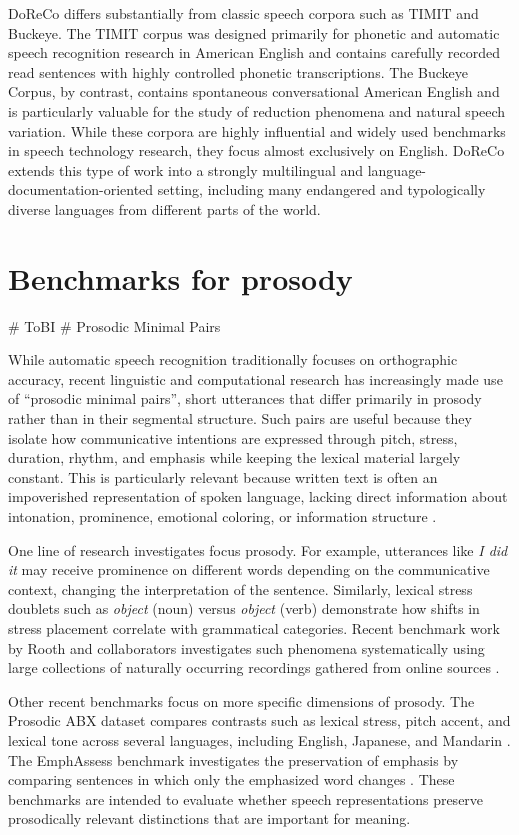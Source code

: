 DoReCo differs substantially from classic speech corpora such as TIMIT and Buckeye. The TIMIT corpus was designed primarily for phonetic and automatic speech recognition research in American English and contains carefully recorded read sentences with highly controlled phonetic transcriptions. The Buckeye Corpus, by contrast, contains spontaneous conversational American English and is particularly valuable for the study of reduction phenomena and natural speech variation. While these corpora are highly influential and widely used benchmarks in speech technology research, they focus almost exclusively on English. DoReCo extends this type of work into a strongly multilingual and language-documentation-oriented setting, including many endangered and typologically diverse languages from different parts of the world.

\section{Benchmarks for prosody}

# ToBI
# Prosodic Minimal Pairs

While automatic speech recognition traditionally focuses on orthographic accuracy, recent linguistic and computational research has increasingly made use of ``prosodic minimal pairs'', short utterances that differ primarily in prosody rather than in their segmental structure. Such pairs are useful because they isolate how communicative intentions are expressed through pitch, stress, duration, rhythm, and emphasis while keeping the lexical material largely constant. This is particularly relevant because written text is often an impoverished representation of spoken language, lacking direct information about intonation, prominence, emotional coloring, or information structure \cite{nguyen2023expresso}.

One line of research investigates focus prosody. For example, utterances like \textit{I did it} may receive prominence on different words depending on the communicative context, changing the interpretation of the sentence. Similarly, lexical stress doublets such as \textit{object} (noun) versus \textit{object} (verb) demonstrate how shifts in stress placement correlate with grammatical categories. Recent benchmark work by Rooth and collaborators investigates such phenomena systematically using large collections of naturally occurring recordings gathered from online sources \cite{lagisetty2026ml}. 

Other recent benchmarks focus on more specific dimensions of prosody. The Prosodic ABX dataset compares contrasts such as lexical stress, pitch accent, and lexical tone across several languages, including English, Japanese, and Mandarin \cite{sun2025prosodic}. The EmphAssess benchmark investigates the preservation of emphasis by comparing sentences in which only the emphasized word changes \cite{cassini2024emphasis}. These benchmarks are intended to evaluate whether speech representations preserve prosodically relevant distinctions that are important for meaning.

